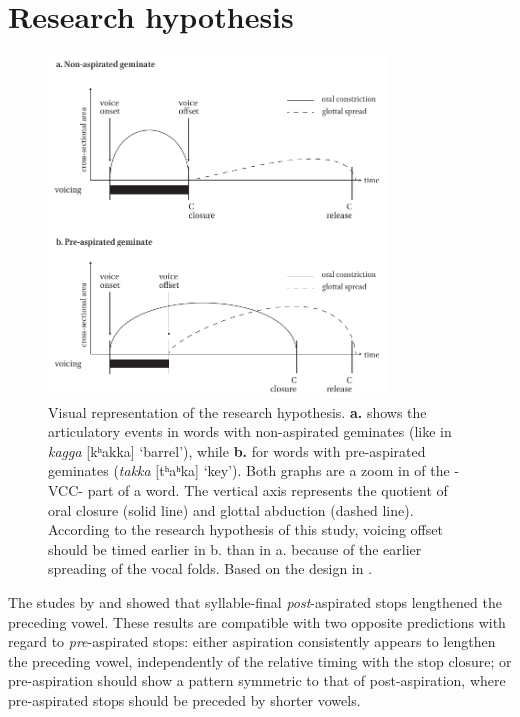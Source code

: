 \documentclass[11pt,a4paper,openany]{memoir}\usepackage[]{graphicx}\usepackage[]{color}
\begin{document}
\section{Research hypothesis}
\label{s:hypothesis}

\begin{figure}
\centering
\includegraphics[width=0.8\textwidth]{hypothesis}
\caption[Visual representation of the research hypothesis.]{Visual representation of the research hypothesis.
\textbf{a.} shows the articulatory events in words with non-aspirated geminates (like in \textit{kagga} [kʰakka] `barrel'), while \textbf{b.} for words with pre-aspirated geminates (\textit{takka} [tʰaʰka] `key').
Both graphs are a zoom in of the -VCC- part of a word.
The vertical axis represents the quotient of oral closure (solid line) and glottal abduction (dashed line).
According to the research hypothesis of this study, voicing offset should be timed earlier in b. than in a. because of the earlier spreading of the vocal folds.
Based on the design in \citet{esposito2002}.}
\label{f:hypothesis}
\end{figure}


The studes by \citet{maddieson1976} and \citet{durvasula2012} showed that syllable-final \textit{post}-aspirated stops lengthened the preceding vowel.
These results are compatible with two opposite predictions with regard to \textit{pre}-aspirated stops: either aspiration consistently appears to lengthen the preceding vowel, independently of the relative timing with the stop closure; or pre-aspiration should show a pattern symmetric to that of post-aspiration, where pre-aspirated stops should be preceded by shorter vowels.
\end{document}
